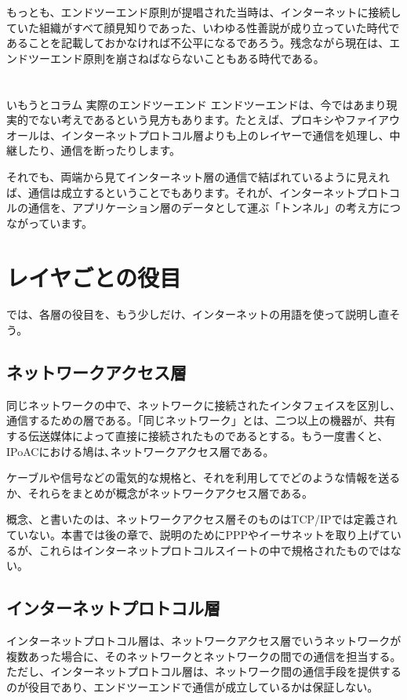もっとも、エンドツーエンド原則が提唱された当時は、インターネットに接続していた組織がすべて顔見知りであった、いわゆる性善説が成り立っていた時代であることを記載しておかなければ不公平になるであろう。残念ながら現在は、エンドツーエンド原則を崩さねばならないこともある時代である。

\section*{}
\begin{itembox}[l]{いもうとコラム 実際のエンドツーエンド}
エンドツーエンドは、今ではあまり現実的でない考えであるという見方もあります。たとえば、プロキシやファイアウオールは、インターネットプロトコル層よりも上のレイヤーで通信を処理し、中継したり、通信を断ったりします。

それでも、両端から見てインターネット層の通信で結ばれているように見えれば、通信は成立するということでもあります。それが、インターネットプロトコルの通信を、アプリケーション層のデータとして運ぶ「トンネル」の考え方につながっています。


\end{itembox}


\section{レイヤごとの役目}
では、各層の役目を、もう少しだけ、インターネットの用語を使って説明し直そう。

\subsection{ネットワークアクセス層}
同じネットワークの中で、ネットワークに接続されたインタフェイスを区別し、通信するための層である。「同じネットワーク」とは、二つ以上の機器が、共有する伝送媒体によって直接に接続されたものであるとする。もう一度書くと、IPoACにおける鳩は､ネットワークアクセス層である。

ケーブルや信号などの電気的な規格と、それを利用してでどのような情報を送るか、それらをまとめが概念がネットワークアクセス層である。

概念、と書いたのは、ネットワークアクセス層そのものはTCP/IPでは定義されていない。本書では後の章で、説明のためにPPPやイーサネットを取り上げているが、これらはインターネットプロトコルスイートの中で規格されたものではない。


\subsection{インターネットプロトコル層}
インターネットプロトコル層は、ネットワークアクセス層でいうネットワークが複数あった場合に、そのネットワークとネットワークの間での通信を担当する。ただし、インターネットプロトコル層は、ネットワーク間の通信手段を提供するのが役目であり、エンドツーエンドで通信が成立しているかは保証しない。

